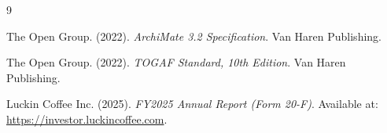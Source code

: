 \documentclass[12pt,a4paper]{article}
\begin{document}
\begingroup
\small
\setlength{\itemsep}{0pt}
\begin{thebibliography}{9}

The Open Group. (2022).
\emph{ArchiMate 3.2 Specification}.
Van Haren Publishing.

The Open Group. (2022).
\emph{TOGAF Standard, 10th Edition}.
Van Haren Publishing.

Luckin Coffee Inc. (2025).
\emph{FY2025 Annual Report (Form 20-F)}.
Available at: \url{https://investor.luckincoffee.com}.

\end{thebibliography}
\endgroup
\end{document}
